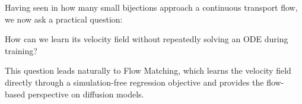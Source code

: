Having seen in  how many small bijections
approach a continuous transport flow, we now ask a practical question:
\begin{question}
    How can we learn its velocity field without repeatedly solving an ODE
during training?
\end{question}
 This question leads naturally to Flow Matching, which
learns the velocity field directly through a simulation-free regression
objective and provides the flow-based perspective on diffusion models.



